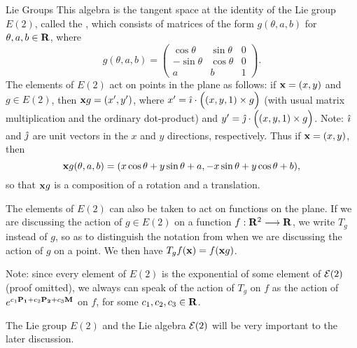 \begin{section}{Lie Groups}
This algebra is the tangent space at the identity of the Lie group $E(2)$, called the  , which consists of matrices of the form $g(\theta,a,b)$ for $\theta, a, b \in \mathbf{R}$, where
\[
g(\theta,a,b) = \left(	\begin{array}{rrr}
			\cos \theta	&\sin \theta	& 0	\\
			-\sin \theta	&\cos \theta	& 0	\\
			a		& b		& 1
\end{array} \right).
\]
The elements of $E(2)$ act on points in the plane as follows: if $\mathbf{x} = (x,y)$ and $g \in E(2)$, then $\mathbf{x} g = (x^\prime,y^\prime)$, where $x^\prime = \hat{\mathbf{\imath}} \cdot \Big((x,y,1) \times g \Big)$ (with usual matrix multiplication and the ordinary dot-product) and $y^\prime = \hat{\mathbf{\jmath}} \cdot \Big((x,y,1) \times g \Big)$.  Note: $\hat{\mathbf{\imath}}$ and $\hat{\mathbf{\jmath}}$ are unit vectors in the $x$ and $y$ directions, respectively.  Thus if $\mathbf{x} = (x,y)$, then
\[
\mathbf{x} g(\theta,a,b) = (x \cos \theta + y \sin \theta + a, -x \sin \theta + y \cos \theta + b),
\]
so that $\mathbf{x} g$ is a composition of a rotation and a translation.

The elements of $E(2)$ can also be taken to act on functions on the plane.  If we are discussing the action of $g \in E(2)$ on a function $f: \mathbf{R}^2 \longrightarrow \mathbf{R}$, we write $T_g$ instead of $g$, so as to distinguish the notation from when we are discussing the action of $g$ on a point.  We then have $T_g f(\mathbf{x}) = f(\mathbf{x} g)$.

Note: since every element of $E(2)$ is the exponential of some element of $\mathcal{E}(2)$ (proof omitted), we always can speak of the action of $T_g$ on $f$ as the action of $e^{c_1 \mathbf{P_1} + c_2 \mathbf{P_2} + c_3 \mathbf{M}}$ on $f$, for some $c_1, c_2, c_3 \in \mathbf{R}$.

\eex

The Lie group $E(2)$ and the Lie algebra $\mathcal{E}(2)$ will be very important to the later discussion.

\end{section}
